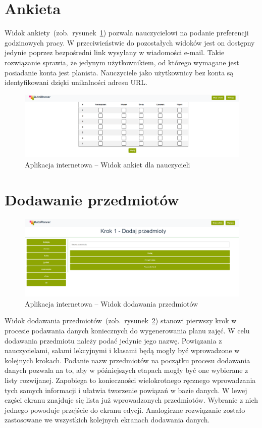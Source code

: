 \section{Ankieta}
Widok ankiety~(zob.~rysunek~\ref{rys:poll}) pozwala nauczycielowi na podanie preferencji godzinowych pracy. W przeciwieństwie do pozostałych widoków jest on dostępny jedynie poprzez bezpośredni link wysyłany w wiadomości e-mail. Takie rozwiązanie sprawia, że jedynym użytkownikiem, od którego wymagane jest posiadanie konta jest planista. Nauczyciele jako użytkownicy bez konta są identyfikowani dzięki unikalności adresu URL.
\begin{figure}[!ht]
\centering\includegraphics[width=\textwidth]{figures/poll}
\caption{Aplikacja internetowa -- Widok ankiet dla nauczycieli}\label{rys:poll}
\end{figure}
\section{Dodawanie przedmiotów}
\begin{figure}[!ht]
\centering\includegraphics[width=\textwidth]{figures/subject}
\caption{Aplikacja internetowa -- Widok dodawania przedmiotów}\label{rys:subject}
\end{figure}
Widok dodawania przedmiotów~(zob.~rysunek~\ref{rys:subject}) stanowi pierwszy krok w procesie podawania danych koniecznych do wygenerowania planu zajęć. W celu dodawania przedmiotu należy podać jedynie jego nazwę. Powiązania z nauczycielami, salami lekcyjnymi i klasami będą mogły być wprowadzone w kolejnych krokach. Podanie nazw przedmiotów na początku procesu dodawania danych pozwala na to, aby w późniejszych etapach mogły być one wybierane z listy rozwijanej. Zapobiega to konieczności wielokrotnego ręcznego wprowadzania tych samych informacji i ułatwia tworzenie powiązań w bazie danych. W lewej części ekranu znajduje się lista już wprowadzonych przedmiotów. Wybranie z nich jednego powoduje przejście do ekranu edycji. Analogiczne rozwiązanie zostało zastosowane we wszystkich kolejnych ekranach dodawania danych.
